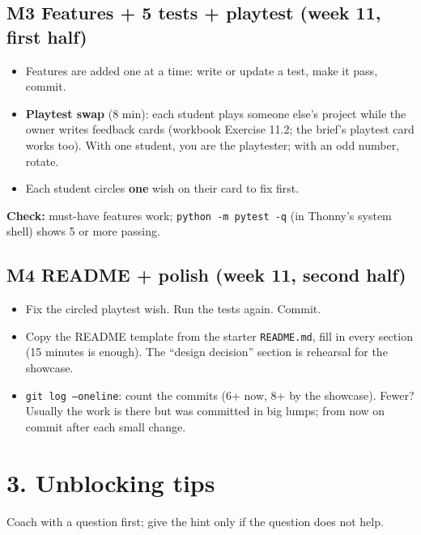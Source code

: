 \documentclass[level=3,teacher]{kidscode}
\begin{document}
\subsection{M3 Features + 5 tests + playtest (week 11, first half)}
\begin{itemize}[itemsep=2pt]
  \item Features are added one at a time: write or update a test, make it pass, commit.
  \item \textbf{Playtest swap} (8 min): each student plays someone else's project while the owner
        writes feedback cards (workbook Exercise 11.2; the brief's playtest card works too). With one student, you are the playtester; with an odd number, rotate.
  \item Each student circles \textbf{one} wish on their card to fix first.
\end{itemize}
\textbf{Check:} must-have features work; \texttt{python -m pytest -q} (in Thonny's system shell) shows 5 or more passing.

\subsection{M4 README + polish (week 11, second half)}
\begin{itemize}[itemsep=2pt]
  \item Fix the circled playtest wish. Run the tests again. Commit.
  \item Copy the README template from the starter \texttt{README.md}, fill in every section (15
        minutes is enough). The \enquote{design decision} section is rehearsal for the showcase.
  \item \texttt{git log --oneline}: count the commits (6+ now, 8+ by the showcase). Fewer? Usually the work is there
        but was committed in big lumps; from now on commit after each small change.
\end{itemize}

\section{3. Unblocking tips}

Coach with a question first; give the hint only if the question does not help.
\end{document}
